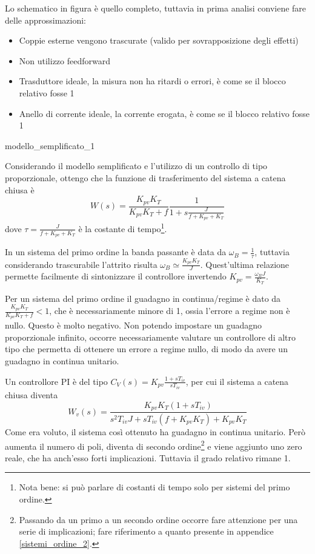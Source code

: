 Lo schematico in figura è quello completo, tuttavia in prima analisi conviene fare delle approssimazioni:
\begin{itemize}
    \item Coppie esterne vengono trascurate (valido per sovrapposizione degli effetti)
    \item Non utilizzo feedforward
    \item Trasduttore ideale, la misura non ha ritardi o errori, è come se il blocco relativo fosse 1
    \item Anello di corrente ideale, la corrente erogata, è come se il blocco relativo fosse 1
\end{itemize}

{modello_semplificato_1}

Considerando il modello semplificato e l'utilizzo di un controllo di tipo proporzionale, ottengo che la funzione di trasferimento del sistema a catena chiusa è 
\[W(s)=\frac{K_{pv}K_T}{K_{pv}K_T+f}\frac{1}{1+s\frac{J}{f+K_{pv}+K_T}}\]
dove \(\tau = \frac{J}{f+K_{pv}+K_T}\) è la costante di tempo\footnote{Nota bene: si può parlare di costanti di tempo solo per sistemi del primo ordine.}.

In un sistema del primo ordine la banda passante è data da \(\omega_B=\frac{1}{\tau}\), tuttavia considerando trascurabile l'attrito risulta \(\omega_B\simeq \frac{K_{pv}K_T}{J}\). Quest'ultima relazione permette facilmente di sintonizzare il controllore invertendo \(K_{pv}=\frac{\omega_B J}{K_T}\).

Per un sistema del primo ordine il guadagno in continua/regime è dato da \(\frac{K_{pv}K_T}{K_{pv}K_T+f}<1\), che è necessariamente minore di 1, ossia l'errore a regime non è nullo. Questo è molto negativo. Non potendo impostare un guadagno proporzionale infinito, occorre necessariamente valutare un controllore di altro tipo che permetta di ottenere un errore a regime nullo, di modo da avere un guadagno in continua unitario.

Un controllore PI è del tipo \(C_V(s)=K_{pv}\frac{1+sT_{iv}}{sT_{iv}}\), per cui il sistema a catena chiusa diventa 
\[W_v(s)=\frac{K_{pv}K_T(1+sT_{iv})}{s^2T_{iv}J + sT_{iv}(f+K_{pv}K_T)+K_{pv}K_T}\]
Come era voluto, il sistema così ottenuto ha guadagno in continua unitario.
Però aumenta il numero di poli, diventa di secondo ordine\footnote{Passando da un primo a un secondo ordine occorre fare attenzione per una serie di implicazioni; fare riferimento a quanto presente in appendice \ref{sistemi_ordine_2}.} e viene aggiunto uno zero reale, che ha anch'esso forti implicazioni. Tuttavia il grado relativo rimane 1.

